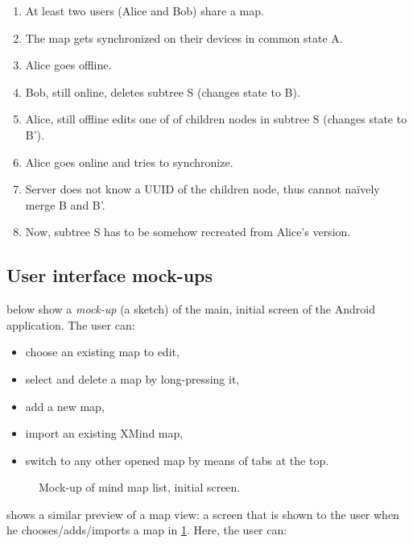 \begin{enumerate}
	\item At least two users (Alice and Bob) share a map.
	\item The map gets synchronized on their devices in common state A.
	\item Alice goes offline.
	\item Bob, still online, deletes subtree S (changes state to B).
	\item Alice, still offline edits one of of children nodes in subtree S (changes state to B').
	\item Alice goes online and tries to synchronize.
	\item Server does not know a UUID of the children node, thus cannot naïvely merge B and B'.
	\item Now, subtree S has to be somehow recreated from Alice's version.
\end{enumerate}


\subsection{User interface mock-ups}
\label{subsec:ui-mockups}

 below show a \emph{mock-up} (a sketch) of the main, initial screen of the Android application. The user can:

\begin{itemize}
	\item choose an existing map to edit,
	\item select and delete a map by long-pressing it,
	\item add a new map,
	\item import an existing XMind map,
	\item switch to any other opened map by means of tabs at the top.
\end{itemize}

\begin{figure}[h]
	\centering
	\caption{Mock-up of mind map list, initial screen.}
	\label{fig:mockup-maplist}
\end{figure}

 shows a similar preview of a map view: a screen that is shown to the user when he chooses/adds/imports a map in \cref{fig:mockup-maplist}. Here, the user can:

